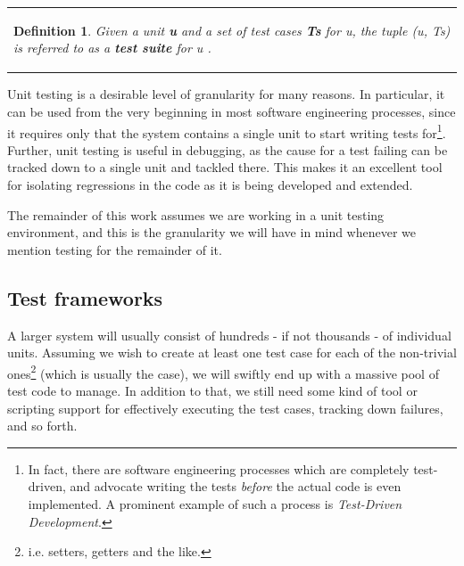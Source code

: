 \documentclass{article}
\newcommand{\tmem}[1]{{\em #1\/}}
\newcommand{\tmstrong}[1]{\textbf{#1}}
\newenvironment{tmparmod}[3]{\begin{list}{}{\setlength{\topsep}{0pt}\setlength{\leftmargin}{#1}\setlength{\rightmargin}{#2}\setlength{\parindent}{#3}\setlength{\listparindent}{\parindent}\setlength{\itemindent}{\parindent}\setlength{\parsep}{\parskip}} \item[]}{\end{list}}
\newtheorem{definition}{Definition}
{\theorembodyfont{\rmfamily}\newtheorem{example}{Example}}
\begin{document}
\begin{tmparmod}{1m}{0pt}{0pt}
  \begin{tmparmod}{1cm}{0pt}{0pt}
    \begin{tmparmod}{0pt}{1cm}{0pt}
      {\noindent}{\noindent}\begin{tabular}{l}
        \begin{definition}
          
          
          
          
          Given a unit {\tmem{{\tmstrong{u}}}} and a set of test cases
          {\tmstrong{{\tmem{Ts}}}} for {\tmem{u}}, the tuple (u, Ts) is
          referred to as a {\tmstrong{test suite}} for {\tmem{u}} .
        \end{definition}
      \end{tabular}{\hspace*{\fill}}{\smallskip}
    \end{tmparmod}
  \end{tmparmod}
\end{tmparmod}





Unit testing is a desirable level of granularity for many reasons. In
particular, it can be used from the very beginning in most software
engineering processes, since it requires only that the system contains a
single unit to start writing tests for{\footnote{In fact, there are software
engineering processes which are completely test-driven, and advocate writing
the tests {\tmem{before}} the actual code is even implemented. A prominent
example of such a process is {\tmem{Test-Driven Development}}.}}. Further,
unit testing is useful in debugging, as the cause for a test failing can be
tracked down to a single unit and tackled there. This makes it an excellent
tool for isolating regressions in the code as it is being developed and
extended.



The remainder of this work assumes we are working in a unit testing
environment, and this is the granularity we will have in mind whenever we
mention testing for the remainder of it.

\subsection{Test frameworks}

A larger system will usually consist of hundreds - if not thousands - of
individual units. Assuming we wish to create at least one test case for each
of the non-trivial ones{\footnote{i.e. setters, getters and the like.}} (which
is usually the case), we will swiftly end up with a massive pool of test code
to manage. In addition to that, we still need some kind of tool or scripting
support for effectively executing the test cases, tracking down failures, and
so forth.
\end{document}
